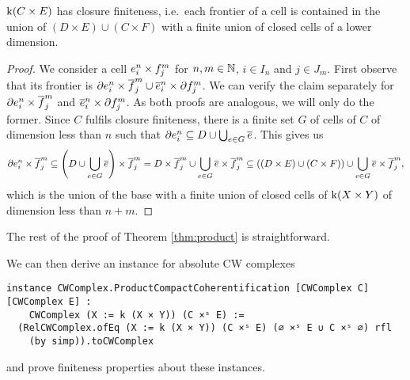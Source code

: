 \begin{lem}
  $\kif (C \times E)$ has closure finiteness, i.e.\ each frontier of a cell is contained in the union of $(D \times E) \cup (C \times F)$ with a finite union of closed cells of a lower dimension.
\end{lem}
\begin{proof}
  We consider a cell $\openCell{n}{i} \times \openCellf{m}{j}$ for $n, m \in \bN$, $i \in I_n$ and $j \in J_m$. 
  First observe that its frontier is $\cellFrontier{n}{i} \times \closedCellf{m}{j} \cup \closedCell{n}{i} \times \cellFrontierf{m}{j}$.
  We can verify the claim separately for $\cellFrontier{n}{i} \times \closedCellf{m}{j}$ and $\closedCell{n}{i} \times \cellFrontierf{m}{j}$. 
  As both proofs are analogous, we will only do the former.
  Since $C$ fulfils closure finiteness, there is a finite set $G$ of cells of $C$ of dimension less than $n$ such that $\cellFrontier{n}{i} \subseteq D \cup \bigcup_{e \in G}\closure{e}$. 
  This gives us 
  \begin{equation*}
    \cellFrontier{n}{i} \times \closedCellf{m}{j} \subseteq \left( D \cup \bigcup_{e \in G}\closure{e} \right) \times \closedCellf{m}{j} = D \times \closedCellf{m}{j} \cup \bigcup_{e \in G} \closure{e} \times \closedCellf{m}{j} \subseteq ((D \times E) \cup (C \times F)) \cup \bigcup_{e \in G} \closure{e} \times \closedCellf{m}{j},
  \end{equation*}
  which is the union of the base with a finite union of closed cells of $\kif (X \times Y)$ of dimension less than $n + m$.
\end{proof}

The rest of the proof of Theorem \ref{thm:product} is straightforward. 

We can then derive an instance for absolute CW complexes 

\begin{lstlisting}[frame=single]
instance CWComplex.ProductCompactCoherentification [CWComplex C] [CWComplex E] :
    CWComplex (X := k (X × Y)) (C ×ˢ E) :=
  (RelCWComplex.ofEq (X := k (X × Y)) (C ×ˢ E) (∅ ×ˢ E ∪ C ×ˢ ∅) rfl 
    (by simp)).toCWComplex
\end{lstlisting}

and prove finiteness properties about these instances. 
